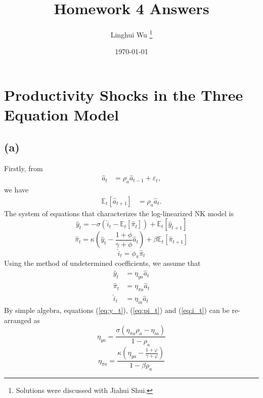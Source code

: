 \documentclass[12pt]{article}
\title{
Homework 4 Answers
}
\author{Linghui Wu
\thanks{Solutions were discussed with Jiahui Shui.}
}
\date{\today}
\newcommand{\E}{\mathbb{E}}
\begin{document}
\maketitle

\section{Productivity Shocks in the Three Equation Model}

\subsection*{(a)}

Firstly, from 
\begin{align*}
\hat{a}_{t} &= \rho_{a} \hat{a}_{t-1} + \varepsilon_{t},
\end{align*}
we have 
\begin{align*}
\E_{t}\left[\hat{a}_{t+1}\right] &= \rho_{a}\hat{a}_{t}.
\end{align*}
The system of equations that characterizes the log-linearized NK model is
\begin{equation}
\label{eq:y_t}
\hat{y}_{t} = -\sigma\left(\hat{i}_{t}-\E_{t}\left[\hat{\pi}_{t}\right]\right) + \E_{t}\left[\hat{y}_{t+1}\right]
\end{equation}
\begin{equation}
\label{eq:pi_t}
\hat{\pi}_{t} = \kappa \left(\hat{y}_{t}-\frac{1+\phi}{\gamma+\phi}\hat{a}_{t}\right) + \beta\E_{t}\left[\hat{\pi}_{t+1}\right]
\end{equation}
\begin{equation}
\label{eq:i_t}
\hat{i}_{t} = \phi_{\pi}\hat{\pi}_{t}
\end{equation}
Using the method of undetermined coefficients, we assume that 
\begin{align*}
\hat{y}_{t} &= \eta_{ya}\hat{a}_{t} \\
\hat{\pi}_{t} &= \eta_{\pi a}\hat{a}_{t} \\
\hat{i}_{t} &= \eta_{ia}\hat{a}_{t}
\end{align*}
By simple algebra, equations (\ref{eq:y_t}), (\ref{eq:pi_t}) and (\ref{eq:i_t}) can be re-arranged as 
\begin{equation}
\label{eq:eta_ya}
\eta_{ya} = \frac{\sigma \left(\eta_{\pi a}\rho_{a}-\eta_{ia}\right)}{1-\rho_{a}}
\end{equation}
\begin{equation}
\label{eq:eta_pia}
\eta_{\pi a} = \frac{\kappa\left(\eta_{ya} - \frac{1+\varphi}{\gamma+\varphi}\right)}{1-\beta\rho_{a}}
\end{equation}
\end{document}
